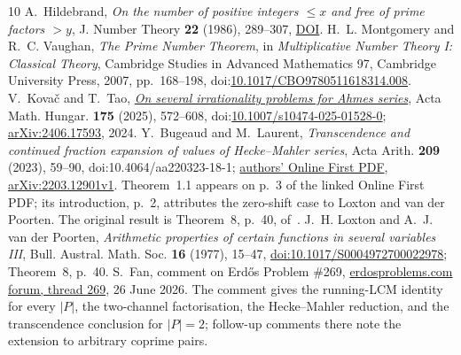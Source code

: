 \documentclass[11pt]{article}
\begin{document}
\begin{thebibliography}{10}
 A.~Hildebrand,
  \emph{On the number of positive integers $\le x$ and free of prime factors
  $>y$}, J. Number Theory \textbf{22} (1986), 289--307,
  \href{https://doi.org/10.1016/0022-314X(86)90013-2}{DOI}.
 H.~L. Montgomery and R.~C. Vaughan,
  \emph{The Prime Number Theorem}, in \emph{Multiplicative Number Theory I:
  Classical Theory}, Cambridge Studies in Advanced Mathematics 97,
  Cambridge University Press, 2007, pp.~168--198,
  doi:\href{https://doi.org/10.1017/CBO9780511618314.008}
  {10.1017/CBO9780511618314.008}.
 V.~Kova\v{c} and T.~Tao,
  \href{https://doi.org/10.1007/s10474-025-01528-0}
  {\emph{On several irrationality problems for Ahmes series}},
  Acta Math. Hungar. \textbf{175} (2025), 572--608,
  doi:\href{https://doi.org/10.1007/s10474-025-01528-0}
  {10.1007/s10474-025-01528-0};
  \href{https://arxiv.org/abs/2406.17593}{arXiv:2406.17593}, 2024.
 Y.~Bugeaud and M.~Laurent,
  \emph{Transcendence and continued fraction expansion of values of
  Hecke--Mahler series}, Acta Arith. \textbf{209} (2023), 59--90,
  doi:10.4064/aa220323-18-1;
  \href{https://irma.math.unistra.fr/~bugeaud/travaux/BuMLAA.pdf}
  {authors' Online First PDF},
  \href{https://arxiv.org/abs/2203.12901}{arXiv:2203.12901v1}.
  Theorem~1.1 appears on p.~3 of the linked Online First PDF; its
  introduction, p.~2, attributes the zero-shift case to Loxton and van der
  Poorten. The original result is Theorem~8, p.~40, of~\cite{loxtonvdp1977}.
 J.~H. Loxton and A.~J. van der Poorten,
  \emph{Arithmetic properties of certain functions in several variables III},
  Bull. Austral. Math. Soc. \textbf{16} (1977), 15--47,
  \href{https://doi.org/10.1017/S0004972700022978}{doi:10.1017/S0004972700022978};
  Theorem~8, p.~40.
 S.~Fan, comment on Erd\H{o}s Problem \#269,
  \href{https://www.erdosproblems.com/forum/thread/269}
  {erdosproblems.com forum, thread 269}, 26 June 2026.  The comment gives the
  running-LCM identity for every $|P|$, the two-channel factorisation, the
  Hecke--Mahler reduction, and the transcendence conclusion for $|P|=2$;
  follow-up comments there note the extension to arbitrary coprime pairs.
\end{thebibliography}
\end{document}
